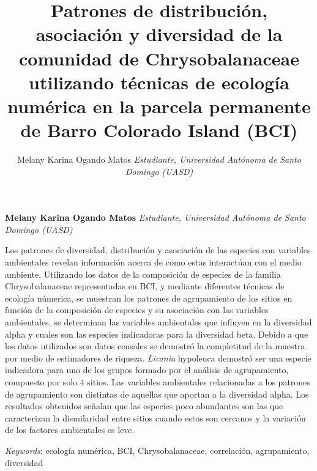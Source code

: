 \documentclass[11pt,]{article}
\title{Patrones de distribución, asociación y diversidad de la comunidad de
Chrysobalanaceae utilizando técnicas de ecología numérica en la parcela
permanente de Barro Colorado Island (BCI)  }
\author{\Large Melany Karina Ogando Matos\vspace{0.05in} \newline\normalsize\emph{Estudiante, Universidad Autónoma de Santo Domingo (UASD)}  }
\date{}
\newcommand*{\authorfont}{\fontfamily{phv}\selectfont}
\renewenvironment{abstract}
 {{%
    \setlength{\leftmargin}{0mm}
    \setlength{\rightmargin}{\leftmargin}%
  }%
  \relax}
 {\endlist}
\begin{document}
	
%

{%
\setlength{\parindent}{0pt}
\thispagestyle{plain}
{\fontsize{18}{20}\selectfont\raggedright 
\maketitle  %

}

{
   \vskip 13.5pt\relax \normalsize\fontsize{11}{12} 
\textbf{\authorfont Melany Karina Ogando Matos} \hskip 15pt \emph{\small Estudiante, Universidad Autónoma de Santo Domingo (UASD)}   

}

}








\begin{abstract}

    \hbox{\vrule height .2pt width 39.14pc}

    \vskip 8.5pt %

\noindent Los patrones de diversidad, distribución y asociación de las especies
con variables ambientales revelan información acerca de como estas
interactúan con el medio ambiente. Utilizando los datos de la
composición de especies de la familia Chrysobalanaceae representadas en
BCI, y mediante diferentes técnicas de ecología númerica, se muestran
los patrones de agrupamiento de los sitios en función de la composición
de especies y su asociación con las variables ambientales, se determinan
las variables ambientales que influyen en la diversidad alpha y cuales
son las especies indicadoras para la diversidad beta. Debido a que los
datos utilizados son datos censales se demostró la completitud de la
muestra por medio de estimadores de riqueza. \emph{Licania }hypoleuca
demostró ser una especie indicadora para uno de los grupos formado por
el análisis de agrupamiento, compuesto por solo 4 sitios. Las variables
ambientales relacionadas a los patrones de agrupamiento son distintas de
aquellas que aportan a la diversidad alpha. Los resultados obtenidos
señalan que las especies poco abundantes son las que caracterizan la
dismilaridad entre sitios cuando estos son cercanos y la variación de
los factores ambientales es leve.


\vskip 8.5pt \noindent \emph{Keywords}: ecología numérica, BCI, Chrysobalanaceae, correlación, agrupamiento,
diversidad \par

    \hbox{\vrule height .2pt width 39.14pc}



\end{abstract}
\end{document}
